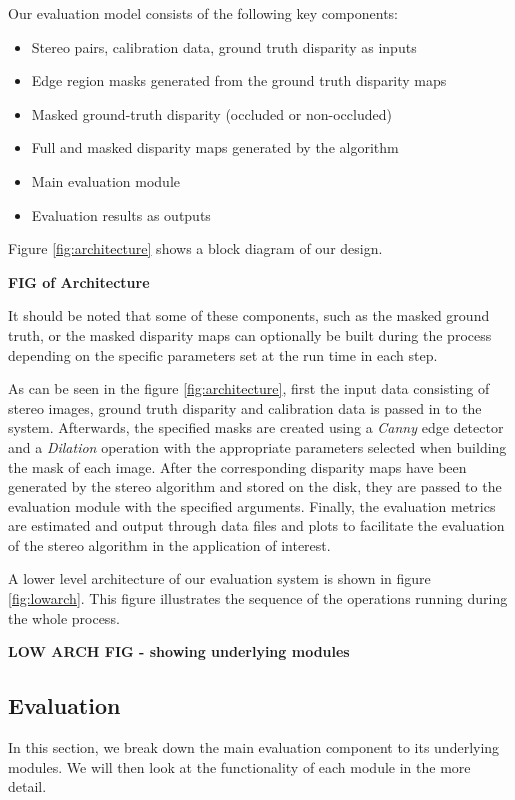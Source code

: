 Our evaluation model consists of the following key components:

\begin{itemize}
\item Stereo pairs, calibration data, ground truth disparity as inputs
\item Edge region masks generated from the ground truth disparity maps
\item Masked ground-truth disparity (occluded or non-occluded)
\item Full and masked disparity maps generated by the algorithm 
\item Main evaluation module
\item Evaluation results as outputs
\end{itemize}

Figure \ref{fig:architecture} shows a block diagram of our design.

\textbf{FIG of Architecture}

It should be noted that some of these components, such as the masked ground truth, or the masked disparity maps 
can optionally be built during the process depending on the specific parameters set at the run time in each step.

As can be seen in the figure \ref{fig:architecture}, first the input data consisting of stereo images, ground truth disparity and calibration data is passed
in to the system.
Afterwards, the specified masks are created using a \textit{Canny} edge detector and a \textit{Dilation} operation with the appropriate parameters 
selected when building the mask of each image.
After the corresponding disparity maps have been generated by the stereo algorithm and stored on the disk, 
they are passed to the evaluation module with the specified arguments.
Finally, the evaluation metrics are estimated and output through data files and plots to facilitate the evaluation of the stereo algorithm in the application
of interest.

A lower level architecture of our evaluation system is shown in figure \ref{fig:lowarch}. This figure illustrates the 
sequence of the operations running during the whole process. 

\textbf{LOW ARCH FIG - showing underlying modules}

\subsection{Evaluation}
In this section, we break down the main evaluation component to its underlying modules. We will then look at the functionality of each
module in the more detail.

